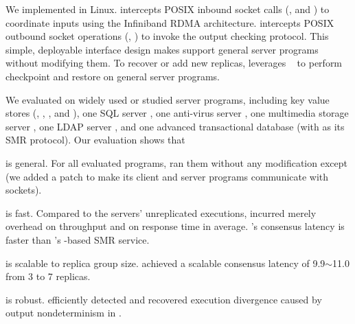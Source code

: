 We implemented \xxx in Linux. \xxx intercepts POSIX inbound socket calls 
(\eg, \accept and \recv) to coordinate inputs using the Infiniband 
RDMA architecture. \xxx intercepts POSIX outbound socket operations (\eg, 
\send) to invoke the output checking protocol. This simple, deployable 
interface design makes \xxx support general server programs without modifying 
them. To recover or add new replicas, \xxx leverages \criu~\cite{criu} to 
perform checkpoint and restore on general server programs.

We evaluated \xxx on \nprog widely used or studied server programs, including 
\nkvprog key value stores (\redis, \memcached, \ssdb, and \mongodb), one SQL 
server \mysql, one anti-virus server \clamav, one multimedia storage server 
\mediatomb, one LDAP server \openldap, and one advanced transactional database 
\calvin (with \zookeeper as its SMR protocol). Our evaluation shows that

\begin{tightenum}
\item \xxx is general. For all evaluated programs, \xxx ran them without any 
modification except \calvin (we added a \nlinescalvin patch to make its client 
and server programs communicate with sockets).

\item \xxx is fast. Compared to the \nprog servers' unreplicated executions, 
\xxx incurred merely \tputoverhead overhead on throughput and \latencyoverhead 
on response time in average. \xxx's consensus latency is \fasterthanzookeeper 
faster than \calvin's \zookeeper-based SMR service.

\item \xxx is scalable to replica group size. \xxx achieved a scalable 
consensus latency of 9.9$\sim$11.0 \us from 3 to 7 replicas.

\item \xxx is robust. \xxx efficiently detected and recovered execution 
divergence caused by output nondeterminism in \clamav.


\end{tightenum}  

